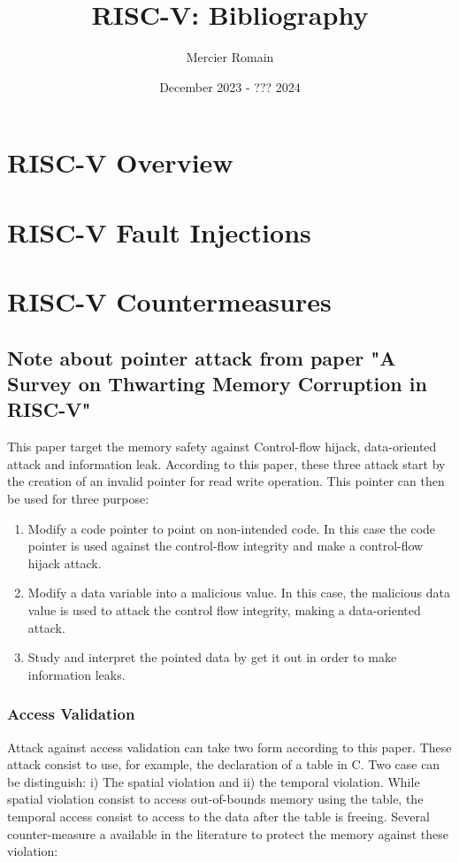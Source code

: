 \documentclass{book}
\title{RISC-V: Bibliography}
\author{Mercier Romain}
\date{December 2023 - ??? 2024}
\begin{document}
	\maketitle
	\tableofcontents
	
	
	\chapter{RISC-V Overview}
	
	\chapter{RISC-V Fault Injections}
	
	\chapter{RISC-V Countermeasures}
	
		\section{Note about pointer attack from paper "A Survey on Thwarting Memory Corruption in RISC-V"}
		
			This paper target the memory safety against Control-flow hijack, data-oriented attack and information leak. According to this paper, these three attack start by the creation of an invalid pointer for read write operation. This pointer can then be used for three purpose:
			\begin{enumerate}
				\item Modify a code pointer to point on non-intended code. In this case the code pointer is used against the control-flow integrity and make a control-flow hijack attack.
				\item Modify a data variable into a malicious value. In this case, the malicious data value is used to attack the control flow integrity, making a data-oriented attack.
				\item Study and interpret the pointed data by get it out in order to make information leaks.
			\end{enumerate}
		
			\subsection{Access Validation}
			
				Attack against access validation can take two form according to this paper. These attack consist to use, for example, the declaration of a table in C. Two case can be distinguish: i) The spatial violation and ii) the temporal violation. While spatial violation consist to access out-of-bounds memory using the table, the temporal access consist to access to the data after the table is freeing. Several counter-measure a available in the literature to protect the memory against these violation:
				
\end{document}
